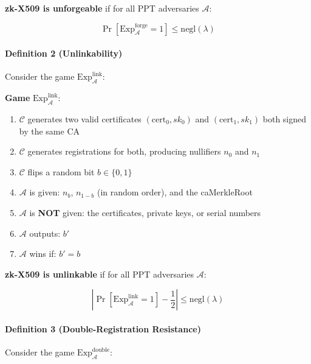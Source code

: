\documentclass[11pt, a4paper]{article}
\begin{document}
\textbf{zk-X509 is unforgeable} if for all PPT adversaries
\(\mathcal{A}\):

\[\Pr[\text{Exp}_{\mathcal{A}}^{\text{forge}} = 1] \leq \text{negl}(\lambda)\]

\paragraph{Definition 2
(Unlinkability)}\label{definition-2-unlinkability}

Consider the game \(\text{Exp}_{\mathcal{A}}^{\text{link}}\):

\begin{mdframed}[linewidth=0.5pt, innertopmargin=6pt, innerbottommargin=6pt]
\small
\textbf{Game} $\text{Exp}_{\mathcal{A}}^{\text{link}}$:
\begin{enumerate}[nosep,leftmargin=1.5em]
\item $\mathcal{C}$ generates two valid certificates $(\text{cert}_0, sk_0)$ and $(\text{cert}_1, sk_1)$ both signed by the same CA
\item $\mathcal{C}$ generates registrations for both, producing nullifiers $n_0$ and $n_1$
\item $\mathcal{C}$ flips a random bit $b \in \{0, 1\}$
\item $\mathcal{A}$ is given: $n_b$, $n_{1-b}$ (in random order), and the caMerkleRoot
\item $\mathcal{A}$ is \textbf{NOT} given: the certificates, private keys, or serial numbers
\item $\mathcal{A}$ outputs: $b'$
\item $\mathcal{A}$ wins if: $b' = b$
\end{enumerate}
\end{mdframed}

\textbf{zk-X509 is unlinkable} if for all PPT adversaries
\(\mathcal{A}\):

\[\left| \Pr[\text{Exp}_{\mathcal{A}}^{\text{link}} = 1] - \frac{1}{2} \right| \leq \text{negl}(\lambda)\]

\paragraph{Definition 3 (Double-Registration
Resistance)}\label{definition-3-double-registration-resistance}

Consider the game \(\text{Exp}_{\mathcal{A}}^{\text{double}}\):
\end{document}
